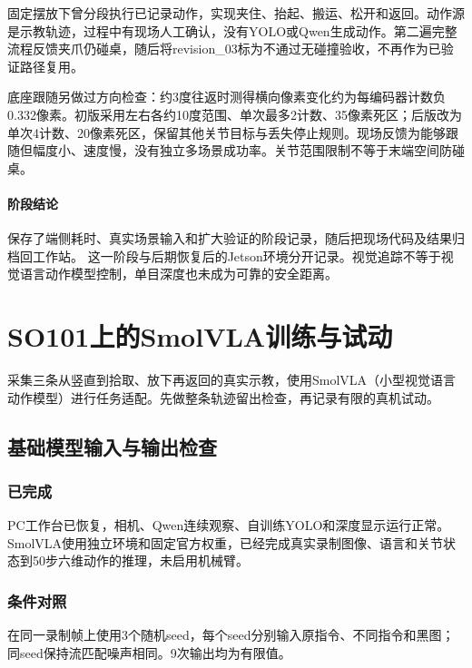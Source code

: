 固定摆放下曾分段执行已记录动作，实现夹住、抬起、搬运、松开和返回。动作源是示教轨迹，过程中有现场人工确认，没有YOLO或Qwen生成动作。第二遍完整流程反馈夹爪仍碰桌，随后将revision\_03标为不通过无碰撞验收，不再作为已验证路径复用。

底座跟随另做过方向检查：约3度往返时测得横向像素变化约为每编码器计数负0.332像素。初版采用左右各约10度范围、单次最多2计数、35像素死区；后版改为单次4计数、20像素死区，保留其他关节目标与丢失停止规则。现场反馈为能够跟随但幅度小、速度慢，没有独立多场景成功率。关节范围限制不等于末端空间防碰桌。


\paragraph{阶段结论}保存了端侧耗时、真实场景输入和扩大验证的阶段记录，随后把现场代码及结果归档回工作站。 这一阶段与后期恢复后的Jetson环境分开记录。视觉追踪不等于视觉语言动作模型控制，单目深度也未成为可靠的安全距离。


\FloatBarrier

\section{SO101上的SmolVLA训练与试动}

\label{stage:s07}

采集三条从竖直到拾取、放下再返回的真实示教，使用SmolVLA（小型视觉语言动作模型）进行任务适配。先做整条轨迹留出检查，再记录有限的真机试动。

\subsection{基础模型输入与输出检查}\label{s07-detail-1}

\subsubsection{已完成}\label{s07-detail-2}

PC工作台已恢复，相机、Qwen连续观察、自训练YOLO和深度显示运行正常。SmolVLA使用独立环境和固定官方权重，已经完成真实录制图像、语言和关节状态到50步六维动作的推理，未启用机械臂。

\subsubsection{条件对照}\label{s07-detail-3}

在同一录制帧上使用3个随机seed，每个seed分别输入原指令、不同指令和黑图；同seed保持流匹配噪声相同。9次输出均为有限值。

